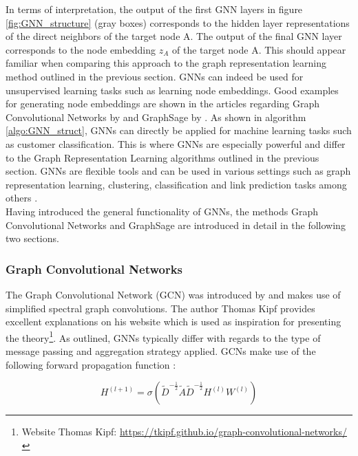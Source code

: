 	\noindent In terms of interpretation, the output of the first GNN layers in
	figure \ref{fig:GNN_structure} (gray boxes) corresponds to the hidden layer 
	representations of the direct neighbors of the target node A. The output of 
	the final GNN layer corresponds to the node embedding $z_{A}$ of the target 
	node A. This should appear familiar when comparing this approach to the graph 
	representation learning method outlined in the previous section. 
	GNNs can indeed be used for unsupervised learning tasks such as learning 
	node embeddings. Good examples for generating node embeddings are shown in 
	the articles regarding Graph Convolutional Networks by \cite{kipf2016semi} 
	and GraphSage by \cite{hamilton2017inductive}. As shown in algorithm 
	\ref{algo:GNN_struct}, GNNs can directly be applied for machine learning
	tasks such as customer classification. This is where GNNs are especially 
	powerful and differ to the Graph Representation Learning algorithms 
	outlined in the previous section. GNNs are flexible tools and can be used 
	in various settings such as graph representation learning, clustering, 
	classification and link prediction tasks among others \citep{zhou2020graph}. \\

	\noindent Having introduced the general functionality of GNNs, the methods
	Graph Convolutional Networks and GraphSage are introduced in detail in the
	following two sections. 

	\subsubsection{Graph Convolutional Networks}
	
	\noindent The Graph Convolutional Network (GCN) was introduced by 
	\cite{kipf2016semi} and makes use of simplified spectral graph
	convolutions. The author Thomas Kipf \citeyearpar{kipf2016online} provides 
	excellent explanations on his website which is used as inspiration for
	presenting the theory\footnote{Website Thomas Kipf: 
	\url{https://tkipf.github.io/graph-convolutional-networks/}}. As outlined, 
	GNNs typically differ with regards to the type of message passing and 
	aggregation strategy applied. GCNs make use of the following forward 
	propagation function \citep[p. 2]{kipf2016semi}:

	\begin{equation}
		H^{(l+1)} = \sigma\left(\tilde D^{-\frac{1}{2}}\tilde A \tilde
		D^{-\frac{1}{2}}H^{(l)}W^{(l)}\right)
		\label{eq:GCN}
	\end{equation}
	
